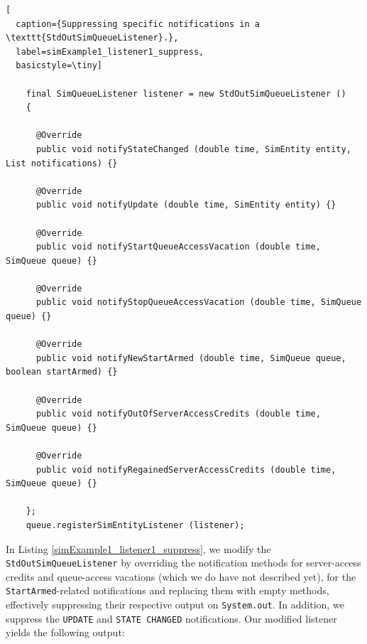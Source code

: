 \documentclass[12pt]{book}
\begin{document}
\begin{lstfloat}
\begin{lstlisting}[
  caption={Suppressing specific notifications in a \texttt{StdOutSimQueueListener}.},
  label=simExample1_listener1_suppress,
  basicstyle=\tiny]

    final SimQueueListener listener = new StdOutSimQueueListener ()
    {
      
      @Override
      public void notifyStateChanged (double time, SimEntity entity, List notifications) {}

      @Override
      public void notifyUpdate (double time, SimEntity entity) {}
      
      @Override
      public void notifyStartQueueAccessVacation (double time, SimQueue queue) {}

      @Override
      public void notifyStopQueueAccessVacation (double time, SimQueue queue) {}

      @Override
      public void notifyNewStartArmed (double time, SimQueue queue, boolean startArmed) {}
      
      @Override
      public void notifyOutOfServerAccessCredits (double time, SimQueue queue) {}

      @Override
      public void notifyRegainedServerAccessCredits (double time, SimQueue queue) {}

    };
    queue.registerSimEntityListener (listener);

\end{lstlisting}
\end{lstfloat}

In Listing \ref{simExample1_listener1_suppress},
  we modify the \lstinline|StdOutSimQueueListener| by overriding
  the notification methods for
  server-access credits
  and queue-access vacations
  (which we do have not described yet),
  for the \lstinline|StartArmed|-related notifications
  and replacing them with empty methods,
  effectively suppressing their respective
  output on \lstinline|System.out|.
In addition,
  we suppress the \lstinline|UPDATE| and \lstinline|STATE CHANGED|
  notifications.
Our modified listener yields the following output:
\end{document}

